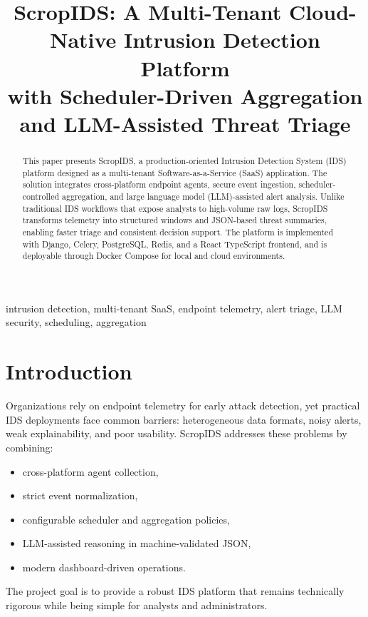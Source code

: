 \documentclass[conference]{IEEEtran}
\title{ScropIDS: A Multi-Tenant Cloud-Native Intrusion Detection Platform\\with Scheduler-Driven Aggregation and LLM-Assisted Threat Triage}
\author{\IEEEauthorblockN{Konda Nagendar}
\IEEEauthorblockA{Independent Researcher}}
\date{}
\begin{document}
\maketitle

\begin{abstract}
This paper presents ScropIDS, a production-oriented Intrusion Detection System (IDS) platform designed as a multi-tenant Software-as-a-Service (SaaS) application. The solution integrates cross-platform endpoint agents, secure event ingestion, scheduler-controlled aggregation, and large language model (LLM)-assisted alert analysis. Unlike traditional IDS workflows that expose analysts to high-volume raw logs, ScropIDS transforms telemetry into structured windows and JSON-based threat summaries, enabling faster triage and consistent decision support. The platform is implemented with Django, Celery, PostgreSQL, Redis, and a React TypeScript frontend, and is deployable through Docker Compose for local and cloud environments.
\end{abstract}

\begin{IEEEkeywords}
intrusion detection, multi-tenant SaaS, endpoint telemetry, alert triage, LLM security, scheduling, aggregation
\end{IEEEkeywords}

\section{Introduction}
Organizations rely on endpoint telemetry for early attack detection, yet practical IDS deployments face common barriers: heterogeneous data formats, noisy alerts, weak explainability, and poor usability. ScropIDS addresses these problems by combining:
\begin{itemize}[leftmargin=1.2em]
    \item cross-platform agent collection,
    \item strict event normalization,
    \item configurable scheduler and aggregation policies,
    \item LLM-assisted reasoning in machine-validated JSON,
    \item modern dashboard-driven operations.
\end{itemize}
The project goal is to provide a robust IDS platform that remains technically rigorous while being simple for analysts and administrators.
\end{document}
